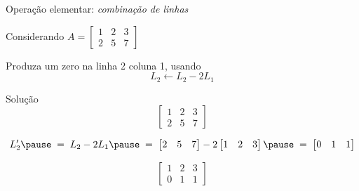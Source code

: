 \begin{question}
  Operação elementar: \emph{combinação de linhas}

  Considerando
  \(
    A =
    \begin{bmatrix}
      1 & 2 & 3 \\
      2 & 5 & 7
    \end{bmatrix}
  \)

  Produza um zero na linha 2 coluna 1, usando
  \[
    L_2\leftarrow L_2-2L_1
  \]
\end{question}

\begin{resolution}{Solução}
\[
  \begin{bmatrix}
    1 & 2 & 3 \\
    2 & 5 & 7
  \end{bmatrix}
\]

\pause
\[
  L'_2
  \pause
  \;=\;
   L_2 - 2L_1
   \pause
  \;=\;
  \begin{bmatrix}
    2 & 5 & 7
  \end{bmatrix}
  -
  2\begin{bmatrix}
    1 & 2 & 3
  \end{bmatrix}
  \pause
  \;=\;
  \begin{bmatrix}
    0 & 1 & 1
  \end{bmatrix}
\]

\pause
\[
  \begin{bmatrix}
    1 & 2 & 3 \\
    0 & 1 & 1
  \end{bmatrix}
\]
\end{resolution}

